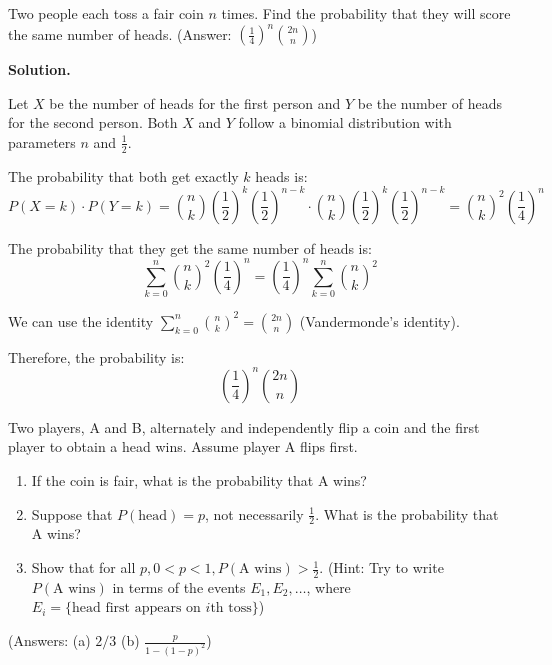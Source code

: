 \begin{problembox}
Two people each toss a fair coin $n$ times. Find the probability that they will score the same number of heads.
(Answer: $(\frac{1}{4})^{n}\binom{2n}{n}$)
\end{problembox}

\noindent\textbf{Solution.}

Let $X$ be the number of heads for the first person and $Y$ be the number of heads for the second person. Both $X$ and $Y$ follow a binomial distribution with parameters $n$ and $\frac{1}{2}$.

The probability that both get exactly $k$ heads is:
\[ P(X = k) \cdot P(Y = k) = \binom{n}{k} \left(\frac{1}{2}\right)^k \left(\frac{1}{2}\right)^{n-k} \cdot \binom{n}{k} \left(\frac{1}{2}\right)^k \left(\frac{1}{2}\right)^{n-k} = \binom{n}{k}^2 \left(\frac{1}{4}\right)^n \]

The probability that they get the same number of heads is:
\[ \sum_{k=0}^{n} \binom{n}{k}^2 \left(\frac{1}{4}\right)^n = \left(\frac{1}{4}\right)^n \sum_{k=0}^{n} \binom{n}{k}^2 \]

We can use the identity $\sum_{k=0}^{n} \binom{n}{k}^2 = \binom{2n}{n}$ (Vandermonde's identity).

Therefore, the probability is:
\[ \left(\frac{1}{4}\right)^n \binom{2n}{n} \]


\begin{problembox}
Two players, A and B, alternately and independently flip a coin and the first player to obtain a head wins. Assume player A flips first.
\begin{enumerate}[label=(\alph*)]
    \item If the coin is fair, what is the probability that A wins?
    \item Suppose that $P(\text{head})=p$, not necessarily $\frac{1}{2}$. What is the probability that A wins?
    \item Show that for all $p,0<p<1,P(\text{A wins})>\frac{1}{2}$. (Hint: Try to write $P(\text{A wins})$ in terms of the events $E_{1},E_{2},\ldots$, where $E_{i}=\{\text{head first appears on }i\text{th toss}\}$)
\end{enumerate}
(Answers: (a) $2/3$ (b) $\frac{p}{1-(1-p)^{2}}$)
\end{problembox}


